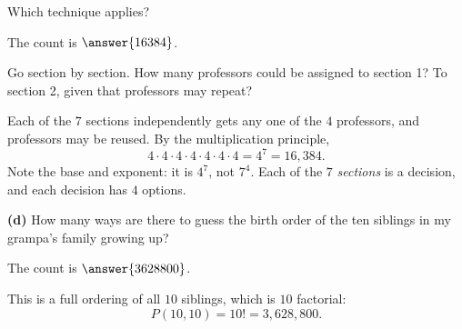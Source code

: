 \documentclass[12pt]{ximera}
\begin{document}
\begin{problem}
\begin{prompt}
Which technique applies?
\begin{multipleChoice}
\end{multipleChoice}

The count is $\answer{16384}$.

\begin{hint}
Go section by section. How many professors could be assigned to section 1? To
section 2, given that professors may repeat?
\end{hint}

\begin{feedback}
Each of the $7$ sections independently gets any one of the $4$ professors, and
professors may be reused. By the multiplication principle,
\[
4\cdot 4\cdot 4\cdot 4\cdot 4\cdot 4\cdot 4 = 4^7 = 16{,}384.
\]
Note the base and exponent: it is $4^7$, not $7^4$. Each of the $7$ \emph{sections}
is a decision, and each decision has $4$ options.
\end{feedback}
\end{prompt}

\begin{prompt}
\textbf{(d)} How many ways are there to guess the birth order of the ten siblings in
my grampa's family growing up?

The count is $\answer{3628800}$.

\begin{feedback}
This is a full ordering of all $10$ siblings, which is $10$ factorial:
\[
P(10,10)=10! = 3{,}628{,}800.
\]
\end{feedback}
\end{prompt}
\end{problem}
\end{document}
